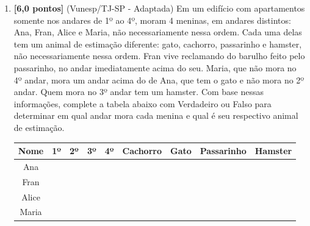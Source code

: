 \documentclass[12pt,a4paper]{article}
\begin{document}
\begin{enumerate}
\begin{enumerate}
      \rule{\linewidth}{0.1mm}
      
      \rule{\linewidth}{0.1mm}
    \end{enumerate}

    \item \textbf{[6,0 pontos]} (Vunesp/TJ-SP - Adaptada) Em um edifício com apartamentos 
    somente nos andares de 1º ao 4º, moram 4 meninas, 
    em andares distintos: Ana, Fran, Alice e Maria, não necessariamente nessa ordem. 
    Cada uma delas tem um animal de estimação diferente: gato, cachorro, passarinho e hamster, 
    não necessariamente nessa ordem. Fran vive reclamando do barulho feito pelo passarinho, 
    no andar imediatamente acima do seu. Maria, que não mora no 4º andar, mora um andar acima do de Ana, 
    que tem o gato e não mora no 2º andar. Quem mora no 3º andar tem um hamster. 
    Com base nessas informações, complete a tabela abaixo com Verdadeiro ou Falso para 
    determinar em qual andar mora cada menina e qual é seu respectivo animal de estimação.
    
  
  \begin{center}
    \begin{tabular}{|c|c|c|c|c|c|c|c|c|}
      \hline
       Nome & 1º & 2º & 3º & 4º & Cachorro & Gato & Passarinho & Hamster \\ \hline
       Ana & & & & & & & & \\ \hline
       Fran & & & & & & & & \\ \hline
       Alice & & & & & & & & \\ \hline
       Maria & & & & & & & & \\ \hline
    \end{tabular}
  \end{center}

\end{enumerate}
\end{document}
